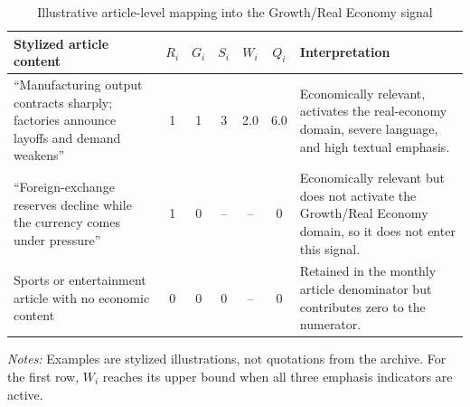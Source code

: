\begin{table}[htbp]
\centering\scriptsize
\caption{Illustrative article-level mapping into the Growth/Real Economy signal}
\label{tab:worked_example}
\begin{tabularx}{\textwidth}{p{}cccccX}
\toprule
Stylized article content & $R_i$ & $G_i$ & $S_i$ & $W_i$ & $Q_i$ & Interpretation \\
\midrule
``Manufacturing output contracts sharply; factories announce layoffs and demand weakens'' & 1 & 1 & 3 & 2.0 & 6.0 & Economically relevant, activates the real-economy domain, severe language, and high textual emphasis. \\
``Foreign-exchange reserves decline while the currency comes under pressure'' & 1 & 0 & -- & -- & 0 & Economically relevant but does not activate the Growth/Real Economy domain, so it does not enter this signal. \\
Sports or entertainment article with no economic content & 0 & 0 & 0 & -- & 0 & Retained in the monthly article denominator but contributes zero to the numerator. \\
\bottomrule
\end{tabularx}
\vspace{0.3em}
\begin{minipage}{0.96\textwidth}\footnotesize\textit{Notes:} Examples are stylized illustrations, not quotations from the archive. For the first row, $W_i$ reaches its upper bound when all three emphasis indicators are active.\end{minipage}
\end{table}
